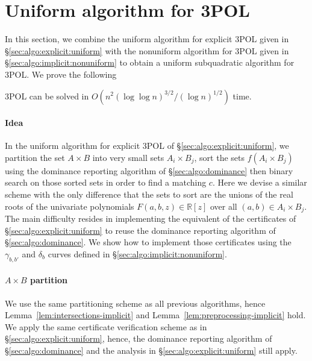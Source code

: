 \section{Uniform algorithm for 3POL}%
\label{sec:algo:implicit:uniform}

In this section, we combine the uniform algorithm for explicit 3POL given in
\S\ref{sec:algo:explicit:uniform} with the nonuniform algorithm for
3POL given in \S\ref{sec:algo:implicit:nonuniform} to obtain a uniform
subquadratic algorithm for 3POL\@.
We prove the following
\begin{theorem}\label{thm:implicit:uniform}
	3POL can be solved in
	$O(n^2 {(\log \log n)}^{3/2} / {(\log n)}^{1/2})$ time.
\end{theorem}

\paragraph{Idea}
In the uniform algorithm for explicit 3POL of
\S\ref{sec:algo:explicit:uniform}, we partition the set $A \times B$
into very small sets $A_i \times B_j$, sort the sets $f(A_i \times B_j)$ using
the dominance reporting algorithm of \S\ref{sec:algo:dominance} then
binary search on those sorted sets in order to find a matching $c$.
%
Here we devise a similar scheme with the only difference that the sets to sort
are the unions of the real roots of the univariate polynomials
$F(a,b,z)\in\mathbb{R}[z]$ over all $(a,b) \in A_i \times B_j$.
%
The main difficulty resides in implementing the
equivalent of the certificates of \S\ref{sec:algo:explicit:uniform} to reuse
the dominance reporting algorithm of \S\ref{sec:algo:dominance}. We show how to
implement those certificates using the $\gamma_{b,b'}$ and $\delta_b$ curves
defined in \S\ref{sec:algo:implicit:nonuniform}.

\paragraph{$A \times B$ partition}
We use the same partitioning scheme as all previous
algorithms, hence Lemma~\ref{lem:intersections-implicit} and
Lemma~\ref{lem:preprocessing-implicit} hold. We apply the same certificate verification
scheme as in \S\ref{sec:algo:explicit:uniform}, hence, the dominance
reporting algorithm of \S\ref{sec:algo:dominance} and the analysis
in \S\ref{sec:algo:explicit:uniform} still apply.

